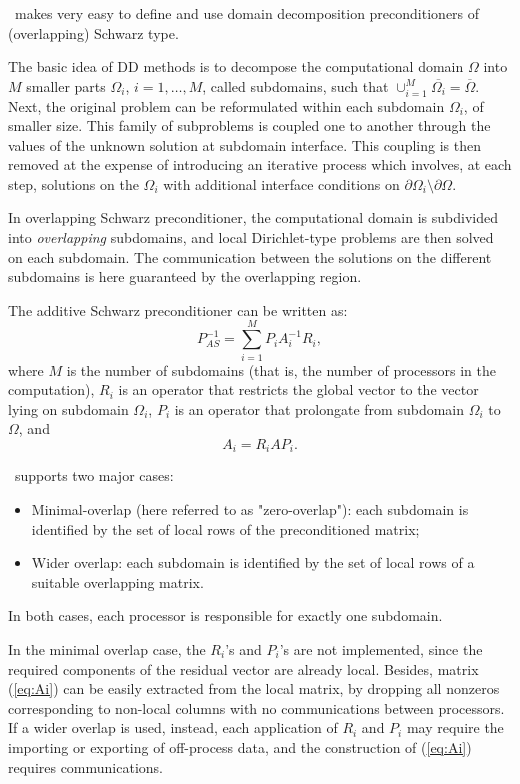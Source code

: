 {\ifpack\ makes very easy to define and use domain decomposition
preconditioners of (overlapping) Schwarz type.

The basic idea of DD methods is to decompose the
computational domain $\Omega$ into $M$ smaller parts $\Omega_i$,
$i=1,\ldots,M$, called subdomains, such that $\cup_{i=1}^{M}
\overline{\Omega_i} = \overline{\Omega}$.  Next, the original problem can
be reformulated within each subdomain $\Omega_i$, of smaller size. This
family of subproblems is coupled one to another through the values of the
unknown solution at subdomain interface. This coupling is then removed at
the expense of introducing an iterative process which involves, at each
step, solutions on the $\Omega_i$ with additional interface conditions on
$\partial \Omega_i \setminus \partial \Omega$.

In overlapping Schwarz preconditioner, the computational domain is
subdivided into {\sl overlapping} subdomains, and local Dirichlet-type
problems are then solved on each subdomain.  The communication between the
solutions on the different subdomains is here guaranteed by the overlapping
region. 

The additive Schwarz preconditioner can be written as:
\begin{equation}
\label{eq:as}
P_{AS}^{-1} = \sum_{i=1}^M P_i A_i^{-1} R_i ,
\end{equation}
where $M$ is the number of subdomains (that is, the number of processors in
the computation), $R_i$ is an operator that restricts the global 
vector to the vector lying on subdomain $\Omega_i$, $P_i$ is an operator that
prolongate from subdomain $\Omega_i$ to $\Omega$, and
\begin{equation}
\label{eq:Ai}
A_i = R_i A P_i.
\end{equation}

\ifpack\ supports two major cases:
\begin{itemize}
\item Minimal-overlap (here referred to as "zero-overlap"): each subdomain
is identified by the set of local rows of the preconditioned matrix;
\item Wider overlap: each subdomain is identified by the set of local rows
of a suitable overlapping matrix.
\end{itemize}
In both cases, each processor is responsible for exactly one subdomain.

In the minimal overlap case, the $R_i$'s and $P_i$'s are not implemented, since the
required components of the residual vector are already local. Besides, matrix
(\ref{eq:Ai}) can be easily extracted from the local matrix, by dropping all
nonzeros corresponding to non-local columns with no 
communications between processors. If a wider overlap
is used, instead, each application of $R_i$ and $P_i$ may require the
importing or exporting of
off-process data, and the construction of (\ref{eq:Ai}) requires
communications.

}
